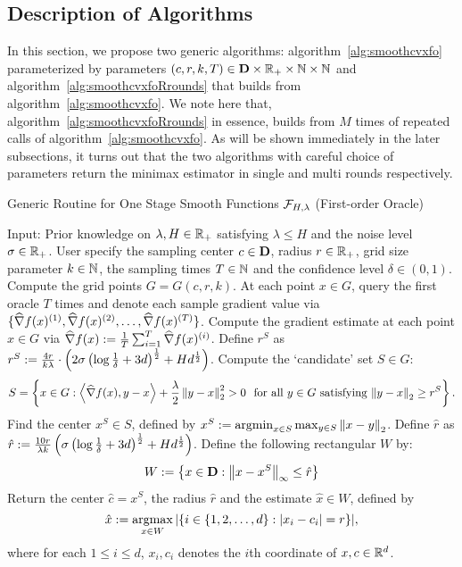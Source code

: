 \subsection{Description of Algorithms}
In this section, we propose two generic algorithms: algorithm~\ref{alg:smoothcvxfo} 
parameterized by parameters $(c,r,k,T)\in \mathbf{D} \times \mathbb{R}_+ \times \mathbb{N} \times \mathbb{N}$ 
and algorithm~\ref{alg:smoothcvxfoRrounds} that builds from algorithm~\ref{alg:smoothcvxfo}.  
We note here that, algorithm~\ref{alg:smoothcvxfoRrounds} in essence, builds 
from $M$ times of repeated calls of algorithm~\ref{alg:smoothcvxfo}.
As will be shown immediately in the later subsections, it turns out that the two algorithms 
with careful choice of parameters return the minimax estimator in single and multi rounds 
respectively.
\begin{algorithm}[htp]
\caption{Generic Routine for One Stage Smooth Functions $\mathcal{F}_{H, \lambda}$ (First-order Oracle)} 
\begin{algorithmic}[1]  
\Statex Input: Prior knowledge on $\lambda, H \in \mathbb{R}_+$ satisfying $\lambda \leq H$ and
	the noise level $\sigma \in \mathbb{R}_+$. User specify the sampling center $c\in \mathbf{D}$, 
	radius $r\in \mathbb{R}_+$, grid size parameter $k\in \mathbb{N}$, the sampling times $T \in \mathbb{N}$ 
	and the confidence level $\delta \in (0, 1)$.
\State Compute the grid points $G = G(c, r, k)$.
\State At each point $x\in G$, query the first oracle $T$ times and denote each 
	sample gradient value via $\{\widehat{\nabla} f(x)^{(1)}, \widehat{\nabla} f(x)^{(2)}, \ldots, 
		\widehat{\nabla} f(x)^{(T)}\}$.
\State Compute the gradient estimate at each point $x \in G$ via 
	$\widehat{\nabla } f(x) := \frac{1}{T} \sum_{i=1}^{T} \widehat{\nabla} f(x)^{(i)}$.
\State Define $r^S$ as $r^S := \frac{4r}{k \lambda} \cdot 
	\left( 2\sigma \left(\log \frac{1}{\delta} + 3d\right)^{\frac{1}{2}} +  H d^{\frac{1}{2}}\right)$.
Compute the `candidate' set $S \in G$:
\begin{equation*}
S = \left\{x \in G: \left<\widehat{\nabla} f(x), y - x\right>  + 
	\frac{\lambda}{2}\left\|{y-x}\right\|_2^2  > 0 ~~\text{for all $y \in G$ 
	satisfying $\left\|{y-x}\right\|_2 \geq r^S$}\right\}.
\end{equation*}  
\State Find the center $x^{S} \in S$, defined by $
		x^{S} \defeq \argmin_{x\in S} \max_{y \in S} \norm{x-y}_2$.
\State Define $\hat{r}$ as $\hat{r} := \frac{10r}{\lambda k}
		\left(\sigma \left(\log \frac{1}{\delta} + 3d\right)^{\frac{1}{2}} + Hd^{\frac{1}{2}} \right)$. 
	Define the following rectangular $W$ by: 
	\begin{equation*}
		W := \left\{x\in \mathbf{D}: \left\|{x-x^{S}}\right\|_\infty 
			\leq \hat{r}\right\}
	\end{equation*}
\State Return the center $\hat{c} = x^S$, the radius $\hat{r}$ 
	and the estimate $\hat{x} \in W$, defined by 
	\begin{equation*}
		\hat{x} \defeq \argmax_{x\in W} |\{i \in \{1, 2, \ldots, d\}:|x_i - c_i| = r\}|, 
	\end{equation*}
	where for each $1\leq i\leq d$, $x_i, c_i$ denotes the $i$th coordinate of $x, c\in \mathbb{R}^d$.
\end{algorithmic}
\label{alg:smoothcvxfo}
\end{algorithm}

